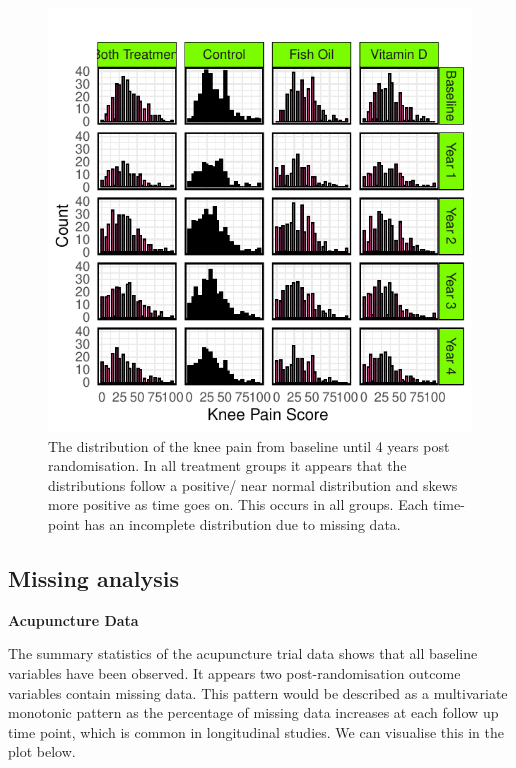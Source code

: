 \documentclass{article}
\newcommand{\pandocbounded}[1]{#1}
\begin{document}
\begin{figure}
\centering
\pandocbounded{\includegraphics[keepaspectratio]{Final_Report_files/figure-latex/unnamed-chunk-17-1.pdf}}
\caption{The distribution of the knee pain from baseline until 4 years
post randomisation. In all treatment groups it appears that the
distributions follow a positive/ near normal distribution and skews more
positive as time goes on. This occurs in all groups. Each time-point has
an incomplete distribution due to missing data.}
\end{figure}

\newpage

\subsection{Missing analysis}\label{missing-analysis}

\textbf{Acupuncture Data}

The summary statistics of the acupuncture trial data shows that all
baseline variables have been observed. It appears two post-randomisation
outcome variables contain missing data. This pattern would be described
as a multivariate monotonic pattern as the percentage of missing data
increases at each follow up time point, which is common in longitudinal
studies. We can visualise this in the plot below.
\end{document}
